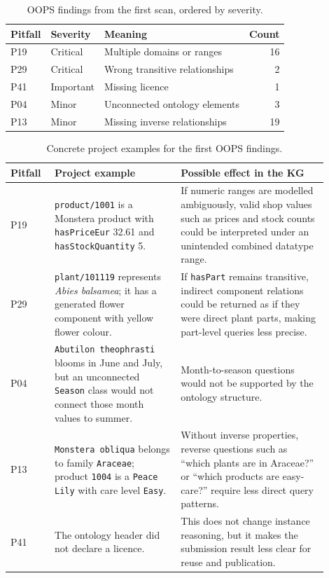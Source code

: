 \documentclass[11pt,a4paper]{article}
\newcommand{\artifact}[1]{\texttt{#1}}
\begin{document}
\begin{table}[h]
\centering
\begin{tabular}{lllr}
\toprule
Pitfall & Severity & Meaning & Count \\
\midrule
P19 & Critical & Multiple domains or ranges & 16 \\
P29 & Critical & Wrong transitive relationships & 2 \\
P41 & Important & Missing licence & 1 \\
P04 & Minor & Unconnected ontology elements & 3 \\
P13 & Minor & Missing inverse relationships & 19 \\
\bottomrule
\end{tabular}
\caption{OOPS findings from the first scan, ordered by severity.}
\label{tab:oops-findings}
\end{table}

\begin{table}[h]
\centering
\begin{tabular}{p{0.12\linewidth}p{0.36\linewidth}p{0.42\linewidth}}
\toprule
Pitfall & Project example & Possible effect in the KG \\
\midrule
P19 &
\artifact{product/1001} is a Monstera product with
\artifact{hasPriceEur} 32.61 and \artifact{hasStockQuantity} 5. &
If numeric ranges are modelled ambiguously, valid shop values such as prices
and stock counts could be interpreted under an unintended combined datatype
range. \\
P29 &
\artifact{plant/101119} represents \emph{Abies balsamea}; it has a generated
flower component with yellow flower colour. &
If \artifact{hasPart} remains transitive, indirect component relations could be
returned as if they were direct plant parts, making part-level queries less
precise. \\
P04 &
\artifact{Abutilon theophrasti} blooms in June and July, but an unconnected
\artifact{Season} class would not connect those month values to summer. &
Month-to-season questions would not be supported by the ontology structure. \\
P13 &
\artifact{Monstera obliqua} belongs to family \artifact{Araceae}; product
\artifact{1004} is a \artifact{Peace Lily} with care level \artifact{Easy}. &
Without inverse properties, reverse questions such as ``which plants are in
Araceae?'' or ``which products are easy-care?'' require less direct query
patterns. \\
P41 &
The ontology header did not declare a licence. &
This does not change instance reasoning, but it makes the submission result less
clear for reuse and publication. \\
\bottomrule
\end{tabular}
\caption{Concrete project examples for the first OOPS findings.}
\label{tab:oops-instance-examples}
\end{table}
\end{document}
